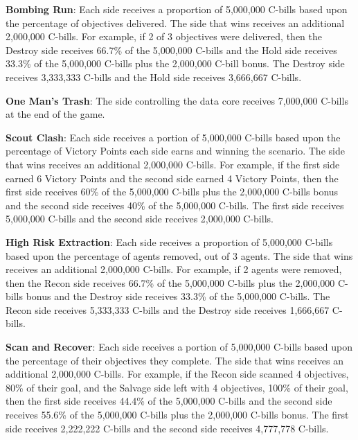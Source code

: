 \begin{description}
\item {\bfseries Bombing Run}: Each side receives a proportion of 5,000,000 C-bills based upon the percentage of objectives delivered.
The side that wins receives an additional 2,000,000 C-bills.
For example, if 2 of 3 objectives were delivered, then the Destroy side receives 66.7\% of the 5,000,000 C-bills and the Hold side receives 33.3\% of the 5,000,000 C-bills plus the 2,000,000 C-bill bonus.
The Destroy side receives 3,333,333 C-bills and the Hold side receives 3,666,667 C-bills.

\item {\bfseries One Man's Trash}: The side controlling the data core receives 7,000,000 C-bills at the end of the game.

\item {\bfseries Scout Clash}: Each side receives a portion of 5,000,000 C-bills based upon the percentage of Victory Points each side earns and winning the scenario.
The side that wins receives an additional 2,000,000 C-bills.
For example, if the first side earned 6 Victory Points and the second side earned 4 Victory Points, then the first side receives 60\% of the 5,000,000 C-bills plus the 2,000,000 C-bills bonus and the second side receives 40\% of the 5,000,000 C-bills.
The first side receives 5,000,000 C-bills and the second side receives 2,000,000 C-bills.

\item {\bfseries High Risk Extraction}: Each side receives a proportion of 5,000,000 C-bills based upon the percentage of agents removed, out of 3 agents.
The side that wins receives an additional 2,000,000 C-bills.
For example, if 2 agents were removed, then the Recon side receives 66.7\% of the 5,000,000 C-bills plus the 2,000,000 C-bills bonus and the Destroy side receives 33.3\% of the 5,000,000 C-bills.
The Recon side receives 5,333,333 C-bills and the Destroy side receives 1,666,667 C-bills.

\item {\bfseries Scan and Recover}: Each side receives a portion of 5,000,000 C-bills based upon the percentage of their objectives they complete.
The side that wins receives an additional 2,000,000 C-bills.
For example, if the Recon side scanned 4 objectives, 80\% of their goal, and the Salvage side left with 4 objectives, 100\% of their goal, then the first side receives 44.4\% of the 5,000,000 C-bills and the second side receives 55.6\% of the 5,000,000 C-bills plus the 2,000,000 C-bills bonus.
The first side receives 2,222,222 C-bills and the second side receives 4,777,778 C-bills.


\end{description}
